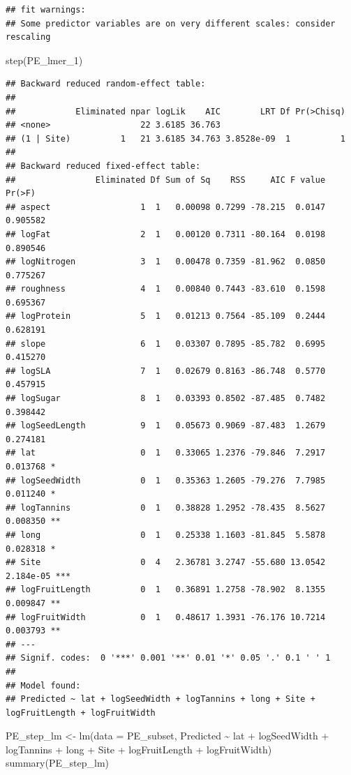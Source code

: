 \documentclass[
  12pt,
]{article}
\newenvironment{Shaded}{\begin{snugshade}}{\end{snugshade}}
\newcommand{\AttributeTok}[1]{\textcolor[rgb]{0.77,0.63,0.00}{#1}}
\newcommand{\FunctionTok}[1]{\textcolor[rgb]{0.00,0.00,0.00}{#1}}
\newcommand{\NormalTok}[1]{#1}
\newcommand{\OtherTok}[1]{\textcolor[rgb]{0.56,0.35,0.01}{#1}}
\newcommand{\SpecialCharTok}[1]{\textcolor[rgb]{0.00,0.00,0.00}{#1}}
\begin{document}
\begin{verbatim}
## fit warnings:
## Some predictor variables are on very different scales: consider rescaling
\end{verbatim}

\begin{Shaded}
\begin{Highlighting}[]
\FunctionTok{step}\NormalTok{(PE\_lmer\_1)}
\end{Highlighting}
\end{Shaded}

\begin{verbatim}
## Backward reduced random-effect table:
## 
##            Eliminated npar logLik    AIC        LRT Df Pr(>Chisq)
## <none>                  22 3.6185 36.763                         
## (1 | Site)          1   21 3.6185 34.763 3.8528e-09  1          1
## 
## Backward reduced fixed-effect table:
##                Eliminated Df Sum of Sq    RSS     AIC F value    Pr(>F)    
## aspect                  1  1   0.00098 0.7299 -78.215  0.0147  0.905582    
## logFat                  2  1   0.00120 0.7311 -80.164  0.0198  0.890546    
## logNitrogen             3  1   0.00478 0.7359 -81.962  0.0850  0.775267    
## roughness               4  1   0.00840 0.7443 -83.610  0.1598  0.695367    
## logProtein              5  1   0.01213 0.7564 -85.109  0.2444  0.628191    
## slope                   6  1   0.03307 0.7895 -85.782  0.6995  0.415270    
## logSLA                  7  1   0.02679 0.8163 -86.748  0.5770  0.457915    
## logSugar                8  1   0.03393 0.8502 -87.485  0.7482  0.398442    
## logSeedLength           9  1   0.05673 0.9069 -87.483  1.2679  0.274181    
## lat                     0  1   0.33065 1.2376 -79.846  7.2917  0.013768 *  
## logSeedWidth            0  1   0.35363 1.2605 -79.276  7.7985  0.011240 *  
## logTannins              0  1   0.38828 1.2952 -78.435  8.5627  0.008350 ** 
## long                    0  1   0.25338 1.1603 -81.845  5.5878  0.028318 *  
## Site                    0  4   2.36781 3.2747 -55.680 13.0542 2.184e-05 ***
## logFruitLength          0  1   0.36891 1.2758 -78.902  8.1355  0.009847 ** 
## logFruitWidth           0  1   0.48617 1.3931 -76.176 10.7214  0.003793 ** 
## ---
## Signif. codes:  0 '***' 0.001 '**' 0.01 '*' 0.05 '.' 0.1 ' ' 1
## 
## Model found:
## Predicted ~ lat + logSeedWidth + logTannins + long + Site + logFruitLength + logFruitWidth
\end{verbatim}

\begin{Shaded}
\begin{Highlighting}[]
\NormalTok{PE\_step\_lm }\OtherTok{\textless{}{-}} \FunctionTok{lm}\NormalTok{(}\AttributeTok{data =}\NormalTok{ PE\_subset, Predicted }\SpecialCharTok{\textasciitilde{}}\NormalTok{ lat }\SpecialCharTok{+}\NormalTok{ logSeedWidth }\SpecialCharTok{+}\NormalTok{ logTannins }\SpecialCharTok{+}\NormalTok{ long }\SpecialCharTok{+}\NormalTok{ Site }\SpecialCharTok{+}\NormalTok{ logFruitLength }\SpecialCharTok{+}\NormalTok{ logFruitWidth)}
\FunctionTok{summary}\NormalTok{(PE\_step\_lm)}
\end{Highlighting}
\end{Shaded}
\end{document}
